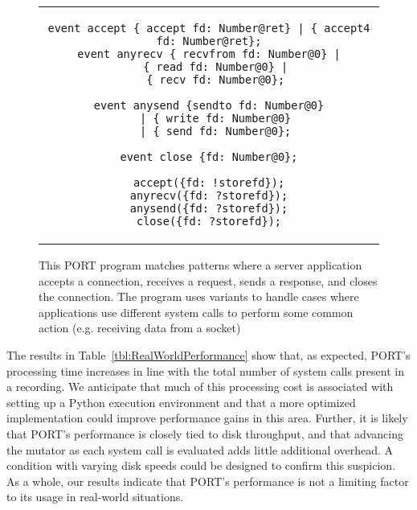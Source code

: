 \begin{figure}[H]
\centering
\begin{tabular}{c}
\begin{lstlisting}
event accept { accept fd: Number@ret} | { accept4 fd: Number@ret};
event anyrecv { recvfrom fd: Number@0} |
  { read fd: Number@0} |
  { recv fd: Number@0};

event anysend {sendto fd: Number@0}
  | { write fd: Number@0}
  | { send fd: Number@0};

event close {fd: Number@0};

accept({fd: !storefd});
anyrecv({fd: ?storefd});
anysend({fd: ?storefd});
close({fd: ?storefd});
\end{lstlisting}
\end{tabular}
\caption{This PORT program matches patterns where a server application
  accepts a connection, receives a request, sends a response, and closes
  the connection.  The program uses variants to handle cases where
  applications use different system calls to perform some common action
  (e.g. receiving data from a socket)}
\label{lst:RealWorldPerformance}
\end{figure}

The results in Table~\ref{tbl:RealWorldPerformance} show that, as expected,
PORT's
processing time increases in line with the total number of system calls
present in a recording.  We anticipate that much of this processing cost is
associated with setting up a Python execution environment and that a more
optimized implementation could improve performance gains in this area.
Further,
it is likely that PORT's performance is closely tied to
disk throughput,
and that advancing the mutator
as each system call is evaluated
adds little additional overhead.
A condition with varying disk
speeds could be designed to confirm this suspicion.  As a whole, our
results indicate that PORT's performance is not a limiting factor to its
usage in real-world situations.

